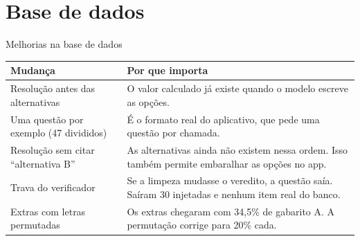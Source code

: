 \documentclass[aspectratio=169,11pt]{beamer}
\begin{document}
\section{Base de dados}
\begin{frame}{Melhorias na base de dados}
  \centering
  \vspace{2pt}

  \scriptsize
  \begin{tabularx}{\textwidth}{@{}lX@{}}
    \toprule
    Mudança & Por que importa \\
    \midrule
    Resolução antes das alternativas & O valor calculado já existe quando o modelo escreve as opções. \\
    Uma questão por exemplo (47 divididos) & É o formato real do aplicativo, que pede uma questão por chamada. \\
    Resolução sem citar ``alternativa B'' & As alternativas ainda não existem nessa ordem. Isso também permite embaralhar as opções no app. \\
    Trava do verificador & Se a limpeza mudasse o veredito, a questão saía. Saíram 30 injetadas e nenhum item real do banco. \\
    Extras com letras permutadas & Os extras chegaram com 34,5\% de gabarito A. A permutação corrige para 20\% cada. \\
    \bottomrule
  \end{tabularx}
\end{frame}
\end{document}

